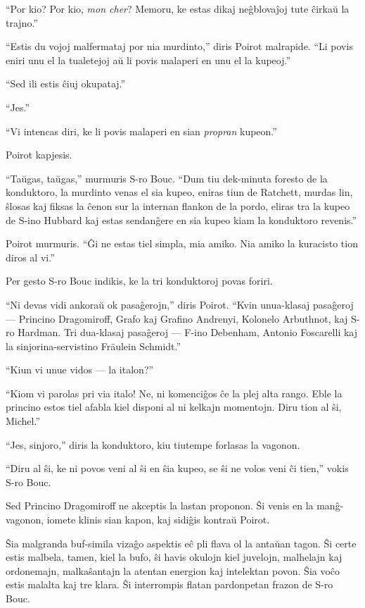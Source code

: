 ``Por kio? Por kio, \emph{mon cher}? Memoru, ke estas dikaj neĝblovaĵoj tute ĉirkaŭ la trajno.''

``Estis du vojoj malfermataj por nia murdinto,'' diris Poirot malrapide. ``Li povis eniri unu el la tualetejoj aŭ li povis malaperi en unu el la kupeoj.''

``Sed ili estis ĉiuj okupataj.''

``Jes.''

``Vi intencas diri, ke li povis malaperi en sian \emph{propran} kupeon.''

Poirot kapjesis.

``Taŭgas, taŭgas,'' murmuris S-ro Bouc. ``Dum tiu dek-minuta foresto de la konduktoro, la murdinto venas el sia kupeo, eniras tiun de Ratchett, murdas lin, ŝlosas kaj fiksas la ĉenon sur la internan flankon de la pordo, eliras tra la kupeo de S-ino Hubbard kaj estas sendanĝere en sia kupeo kiam la konduktoro revenis.''

Poirot murmuris. ``Ĝi ne estas tiel simpla, mia amiko. Nia amiko la kuracisto tion diros al vi.''

Per gesto S-ro Bouc indikis, ke la tri konduktoroj povas foriri.

``Ni devas vidi ankoraŭ ok pasaĝerojn,'' diris Poirot. ``Kvin unua-klasaj pasaĝeroj --- Princino Dragomiroff, Grafo kaj Grafino Andrenyi, Kolonelo Arbuthnot, kaj S-ro Hardman. Tri dua-klasaj pasaĝeroj --- F-ino Debenham, Antonio Foscarelli kaj la sinjorina-servistino Fräulein Schmidt.''

``Kiun vi unue vidos --- la italon?''

``Kiom vi parolas pri via italo! Ne, ni komenciĝos ĉe la plej alta rango. Eble la princino estos tiel afabla kiel disponi al ni kelkajn momentojn. Diru tion al ŝi, Michel.''

``Jes, sinjoro,'' diris la konduktoro, kiu tiutempe forlasas la vagonon.

``Diru al ŝi, ke ni povos veni al ŝi en ŝia kupeo, se ŝi ne volos veni ĉi tien,'' vokis S-ro Bouc.

Sed Princino Dragomiroff ne akceptis la lastan proponon. Ŝi venis en la manĝ-vagonon, iomete klinis sian kapon, kaj sidiĝis kontraŭ Poirot.

Ŝia malgranda buf-simila vizaĝo aspektis eĉ pli flava ol la antaŭan tagon. Ŝi certe estis malbela, tamen, kiel la bufo, ŝi havis okulojn kiel juvelojn, malhelajn kaj ordonemajn, malkaŝantajn la atentan energion kaj intelektan povon. Ŝia voĉo estis malalta kaj tre klara. Ŝi interrompis flatan pardonpetan frazon de S-ro Bouc.

